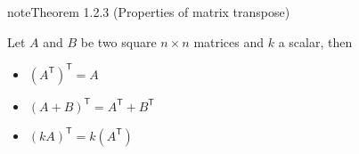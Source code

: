 \documentclass[letterpaper,10pt,english]{jupyterBook}
\begin{document}
\begin{sphinxadmonition}{note}{Theorem 1.2.3 (Properties of matrix transpose)}



\sphinxAtStartPar
Let \(A\) and \(B\) be two square \(n \times n\) matrices and \(k\) a scalar, then
\begin{itemize}
\item {} 
\sphinxAtStartPar
\((A^\mathsf{T})^\mathsf{T} = A\)

\item {} 
\sphinxAtStartPar
\((A + B)^\mathsf{T} = A^\mathsf{T} + B^\mathsf{T}\)

\item {} 
\sphinxAtStartPar
\((k A)^\mathsf{T} = k (A^\mathsf{T})\)

\end{itemize}
\end{sphinxadmonition}
\label{_pages/1.1_Matrix_operations:matrix-transpose-example}
\end{document}
